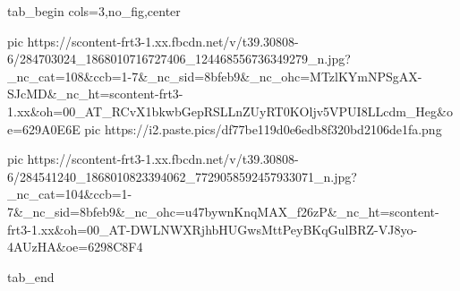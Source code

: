  
 
 
 
 

\ifcmt
  tab_begin cols=3,no_fig,center

     pic https://scontent-frt3-1.xx.fbcdn.net/v/t39.30808-6/284703024_1868010716727406_124468556736349279_n.jpg?_nc_cat=108&ccb=1-7&_nc_sid=8bfeb9&_nc_ohc=MTzlKYmNPSgAX-SJcMD&_nc_ht=scontent-frt3-1.xx&oh=00_AT_RCvX1bkwbGepRSLLnZUyRT0KOljv5VPUI8LLcdm_Heg&oe=629A0E6E
     pic https://i2.paste.pics/df77be119d0e6edb8f320bd2106de1fa.png

     pic https://scontent-frt3-1.xx.fbcdn.net/v/t39.30808-6/284541240_1868010823394062_7729058592457933071_n.jpg?_nc_cat=104&ccb=1-7&_nc_sid=8bfeb9&_nc_ohc=u47bywnKnqMAX_f26zP&_nc_ht=scontent-frt3-1.xx&oh=00_AT-DWLNWXRjhbHUGwsMttPeyBKqGulBRZ-VJ8yo-4AUzHA&oe=6298C8F4

  tab_end
\fi
